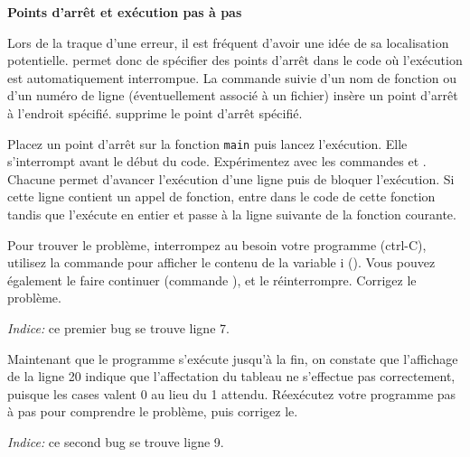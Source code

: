 \documentclass[10pt]{article}\usepackage[nu]{esial}
\begin{document}
\begin{Exercice}
  \noindent \textbf{Points d'arrêt et exécution pas à pas}

  Lors de la traque d'une erreur, il est fréquent d'avoir une idée de sa
  localisation potentielle.  permet donc de spécifier des points
  d'arrêt dans le code où l'exécution est automatiquement interrompue.  La
  commande  suivie d'un nom de fonction ou d'un numéro de ligne
  (éventuellement associé à un fichier) insère un point d'arrêt à l'endroit
  spécifié.  supprime le point d'arrêt spécifié.

  Placez un point d'arrêt sur la fonction \texttt{main} puis lancez
  l'exécution. Elle s'interrompt avant le début du code.  Expérimentez avec les
  commandes  et . Chacune permet d'avancer l'exécution
  d'une ligne puis de bloquer l'exécution.  Si cette ligne contient un appel de
  fonction,  entre dans le code de cette fonction tandis que
   l'exécute en entier et passe à la ligne suivante de la fonction
  courante.

  \Question Pour trouver le problème, interrompez au besoin votre programme
  (ctrl-C), utilisez la commande  pour afficher le contenu de la
  variable i (). Vous pouvez également le faire continuer
  (commande ), et le réinterrompre. Corrigez le problème.

  \textit{Indice:} ce premier bug se trouve ligne 7.

  \Question Maintenant que le programme s'exécute jusqu'à la fin, on constate
  que l'affichage de la ligne 20 indique que l'affectation du tableau ne
  s'effectue pas correctement, puisque les cases valent 0 au lieu du 1
  attendu. Réexécutez votre programme pas à pas pour comprendre le problème,
  puis corrigez le.

  \textit{Indice:} ce second bug se trouve ligne 9.
\end{Exercice}
\end{document}
